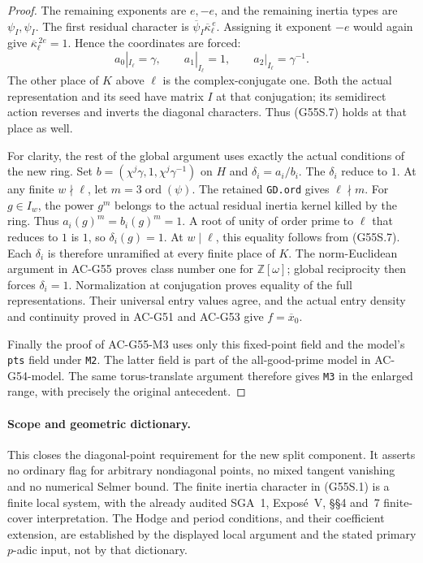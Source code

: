 \begin{proof}
The remaining exponents are $e,-e$, and the
remaining inertia types are $\psi_I,\psi_I$.
The first residual character is
$\overline\psi_I\overline\kappa_\ell^{\,e}$.
Assigning it exponent $-e$ would again give
$\overline\kappa_\ell^{\,2e}=1$.
Hence the coordinates are forced:
\[
       a_0|_{I_\ell}=\gamma,\qquad
       a_1|_{I_\ell}=1,\qquad
       a_2|_{I_\ell}=\gamma^{-1}.
                                                               \tag{G55S.7}
\]
The other place of $K$ above $\ell$ is the
complex-conjugate one.
Both the actual representation and its seed
have matrix $I$ at that conjugation; its
semidirect action reverses and inverts the
diagonal characters.
Thus (G55S.7) holds at that place as well.

For clarity, the rest of the global argument
uses exactly the actual conditions of the
new ring.
Set $b=(\chi^j\gamma,1,\chi^j\gamma^{-1})$
on $H$ and $\delta_i=a_i/b_i$.
The $\delta_i$ reduce to $1$.
At any finite $w\nmid\ell$, let
$m=3\operatorname{ord}(\psi)$.
The retained \texttt{GD.ord} gives $\ell\nmid m$.
For $g\in I_w$, the power $g^m$ belongs
to the actual residual inertia kernel killed
by the ring.
Thus $a_i(g)^m=b_i(g)^m=1$.
A root of unity of order prime to $\ell$
that reduces to $1$ is $1$, so
$\delta_i(g)=1$.
At $w\mid\ell$, this equality follows from
(G55S.7).
Each $\delta_i$ is therefore unramified
at every finite place of $K$.
The norm-Euclidean argument in AC-G55 proves
class number one for $\mathbb Z[\omega]$;
global reciprocity then forces
$\delta_i=1$.
Normalization at conjugation proves equality
of the full representations.
Their universal entry values agree, and the
actual entry density and continuity proved
in AC-G51 and AC-G53 give $f=\overline x_0$.

Finally the proof of AC-G55-M3 uses only
this fixed-point field and the model's
\texttt{pts} field under \texttt{M2}.
The latter field is part of the all-good-prime
model in AC-G54-model.
The same torus-translate argument therefore
gives \texttt{M3} in the enlarged range,
with precisely the original antecedent.
\end{proof}

\paragraph{Scope and geometric dictionary.}
This closes the diagonal-point requirement for
the new split component.  It asserts no
ordinary flag for arbitrary nondiagonal points,
no mixed tangent vanishing and no numerical
Selmer bound.
The finite inertia character in (G55S.1) is
a finite local system, with the already
audited SGA~1, Expos\'e~V, \S\S4 and~7
finite-cover interpretation.
The Hodge and period conditions, and their
coefficient extension, are established by the
displayed local argument and the stated
primary $p$-adic input, not by that dictionary.

